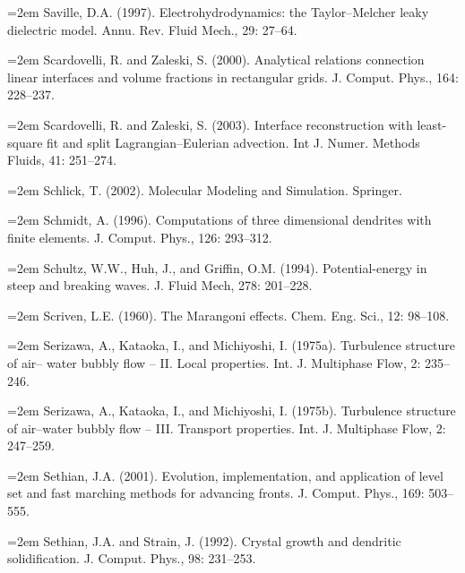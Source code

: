 \documentclass[11pt,a4paper,openany,fontset=none]{ctexbook}
\begin{document}

\par\hangindent=2em Saville, D.A. (1997). Electrohydrodynamics: the Taylor--Melcher leaky dielectric model. Annu. Rev. Fluid Mech., 29: 27--64.

\par\hangindent=2em Scardovelli, R. and Zaleski, S. (2000). Analytical relations connection linear interfaces and volume fractions in rectangular grids. J. Comput. Phys., 164: 228--237.

\par\hangindent=2em Scardovelli, R. and Zaleski, S. (2003). Interface reconstruction with least-square fit and split Lagrangian--Eulerian advection. Int J. Numer. Methods Fluids, 41: 251--274.

\par\hangindent=2em Schlick, T. (2002). Molecular Modeling and Simulation. Springer.

\par\hangindent=2em Schmidt, A. (1996). Computations of three dimensional dendrites with finite elements. J. Comput. Phys., 126: 293--312.

\par\hangindent=2em Schultz, W.W., Huh, J., and Griffin, O.M. (1994). Potential-energy in steep and breaking waves. J. Fluid Mech, 278: 201--228.

\par\hangindent=2em Scriven, L.E. (1960). The Marangoni effects. Chem. Eng. Sci., 12: 98--108.

\par\hangindent=2em Serizawa, A., Kataoka, I., and Michiyoshi, I. (1975a). Turbulence structure of air-- water bubbly flow -- II. Local properties. Int. J. Multiphase Flow, 2: 235--246.

\par\hangindent=2em Serizawa, A., Kataoka, I., and Michiyoshi, I. (1975b). Turbulence structure of air--water bubbly flow -- III. Transport properties. Int. J. Multiphase Flow, 2: 247--259.

\par\hangindent=2em Sethian, J.A. (2001). Evolution, implementation, and application of level set and fast marching methods for advancing fronts. J. Comput. Phys., 169: 503--555.

\par\hangindent=2em Sethian, J.A. and Strain, J. (1992). Crystal growth and dendritic solidification. J. Comput. Phys., 98: 231--253.
\end{document}

